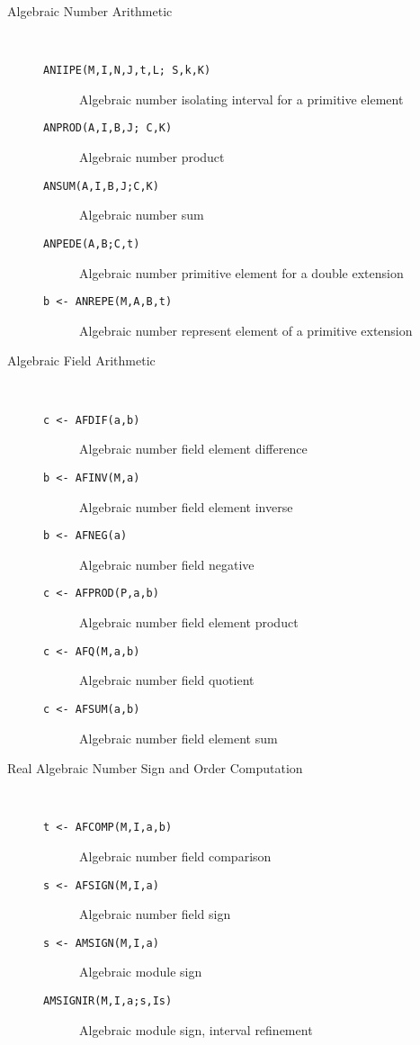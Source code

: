 \begin{description}
\item[Algebraic Number Arithmetic] \ \
\begin{description}
  \item[{\tt  ANIIPE(M,I,N,J,t,L; S,k,K) 
}] Algebraic number isolating interval for a primitive element
  \item[{\tt  ANPROD(A,I,B,J; C,K) 
}] Algebraic number product
  \item[{\tt  ANSUM(A,I,B,J;C,K) 
}] Algebraic number sum
  \item[{\tt  ANPEDE(A,B;C,t) 
}] Algebraic number primitive element for a double extension
  \item[{\tt b <- ANREPE(M,A,B,t) 
}] Algebraic number represent element of a primitive extension
\end{description}

\item[Algebraic Field Arithmetic] \ \

\begin{description}
  \item[{\tt c <- AFDIF(a,b) 
}] Algebraic number field element difference
  \item[{\tt b <- AFINV(M,a) 
}] Algebraic number field element inverse
  \item[{\tt b <- AFNEG(a) 
}] Algebraic number field negative
  \item[{\tt c <- AFPROD(P,a,b) 
}] Algebraic number field element product
  \item[{\tt c <- AFQ(M,a,b) 
}] Algebraic number field quotient
  \item[{\tt c <- AFSUM(a,b) 
}] Algebraic number field element sum
\end{description}

\item[Real Algebraic Number Sign and Order Computation] \ \
\begin{description}
  \item[{\tt t <- AFCOMP(M,I,a,b) 
}] Algebraic number field comparison
  \item[{\tt s <- AFSIGN(M,I,a) 
}]\index{AFSIGN} Algebraic number field sign
  \item[{\tt s <- AMSIGN(M,I,a) 
}]\index{AMSIGN} Algebraic module sign
  \item[{\tt AMSIGNIR(M,I,a;s,Is) 
}]\index{AMSIGNIR} Algebraic module sign, interval refinement
\end{description}


\end{description}
